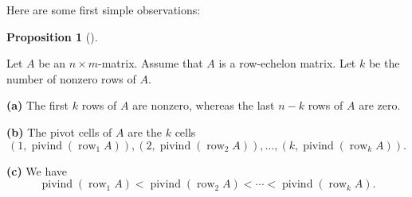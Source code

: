 \documentclass[numbers=enddot,12pt,final,onecolumn,notitlepage]{scrartcl}%
\theoremstyle{definition}
\newtheorem{prop}[theo]{Proposition}
\newenvironment{proposition}[1][]
{\begin{prop}[#1]\begin{leftbar}}
{\end{leftbar}\end{prop}}
\begin{document}
Here are some first simple observations:

\begin{proposition}
\label{prop.row-echelon.pivrows}Let $A$ be an $n\times m$-matrix. Assume that
$A$ is a row-echelon matrix. Let $k$ be the number of nonzero rows of $A$.

\textbf{(a)} The first $k$ rows of $A$ are nonzero, whereas the last $n-k$
rows of $A$ are zero.

\textbf{(b)} The pivot cells of $A$ are the $k$ cells
\[
\left(  1,\operatorname*{pivind}\left(  \operatorname*{row}\nolimits_{1}%
A\right)  \right)  ,\left(  2,\operatorname*{pivind}\left(
\operatorname*{row}\nolimits_{2}A\right)  \right)  ,\ldots,\left(
k,\operatorname*{pivind}\left(  \operatorname*{row}\nolimits_{k}A\right)
\right)  .
\]


\textbf{(c)} We have
\[
\operatorname*{pivind}\left(  \operatorname*{row}\nolimits_{1}A\right)
<\operatorname*{pivind}\left(  \operatorname*{row}\nolimits_{2}A\right)
<\cdots<\operatorname*{pivind}\left(  \operatorname*{row}\nolimits_{k}%
A\right)  .
\]

\end{proposition}
\end{document}
